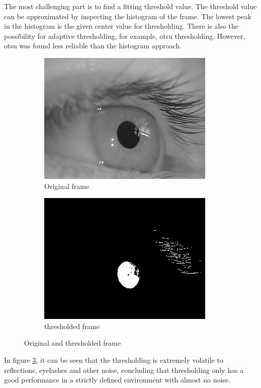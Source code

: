 The most challenging part is to find a fitting threshold value. The threshold value can be approximated by inspecting the histogram of the frame. The lowest peak in the histogram is the given center value for thresholding. There is also the possibility for adaptive thresholding, for example, otsu thresholding. However, otsu was found less reliable than the histogram approach. 

\begin{figure}[ht]
    \centering
    \begin{subfigure}{.5\textwidth}
      \centering
      \includegraphics[width=.9\linewidth]{plots/orig_canny.png}
      \caption{Original frame}
      \label{fig:th_orig}
    \end{subfigure}%
    \begin{subfigure}{.5\textwidth}
      \centering
      \includegraphics[width=.9\linewidth]{plots/thresholded.jpg}
      \caption{thresholded frame}
      \label{fig:th_thres}
    \end{subfigure}
    \caption{Original and thresholded frame}
    \label{fig:simple_thresh}
\end{figure}
In figure \ref{fig:simple_thresh}, it can be seen that the thresholding is extremely volatile to reflections, eyelashes and other noise, concluding that thresholding only has a good performance in a strictly defined environment with almost no noise. 

